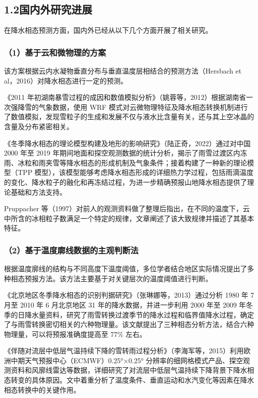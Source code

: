 \subsection*{1.2\quad 国内外研究进展}

在降水相态预测方面，国内外已经从以下几个方面开展了相关研究。

\subsubsection*{（1）基于云和微物理的方案}

该方案根据云内水凝物垂直分布与垂直温度层相结合的预测方法（Hersbach et al，2016）\cite{1}对降水相态进行一定的预测。

《2011 年初湖南暴雪过程的成因和数值模拟分析》\cite{2}（姚蓉等，2012）根据湖南省一次强降雪的气象数据，使用 WRF 模式对云微物理特征及降水相态转换机制进行了数值模拟，发现雪粒子的生成和发展不仅与液水比含量有关，还与其上空冰晶的含量及分布紧密相关。

《冬季降水相态的理论模型构建及地形的影响研究》\cite{3}（陆正奇，2022）通过对中国 2000 年至 2019 年期间地面和探空观测数据的统计分析，揭示了雨雪过渡区内冻雨、冰粒和雨夹雪等降水相态的形成机制及气象条件；接着构建了一种新的理论模型（TPP 模型），该模型能够考虑降水相态形成的详细热力学过程，包括雨滴温度的变化、降水粒子的融化和再冻结过程，为进一步精确预报山地降水相态提供了理论基础和方法支持。

Pruppacher 等（1997）对前人的观测资料做了整理后指出，在不同的温度下，云中所含的冰相粒子数满足一个特定的规律，文章阐述了该大致规律并描述了其基本特征。

\subsubsection*{（2）基于温度廓线数据的主观判断法}

根据温度廓线的结构与不同高度下温度阈值，多位学者结合地区实际情况提出了多种相态预报方法。该方法主要基于对关键层次的温度阈值进行判断。

《北京地区冬季降水相态的识别判据研究》\cite{4}（张琳娜等，2013）通过分析 1980 年 7 月至 2010 年 6 月北京地区 31 年的降水数据，并进一步利用 2000 年至 2009 年冬季的日降水量资料，研究了雨雪转换过渡季节的降水过程和临界值降水过程，确定了与雨雪转换密切相关的六种物理量。该文献提出了三种相态分析方法，结合六种物理量，可以将预报准确度提高至 77\% 左右。

《伴随对流层中低层气温持续下降的雪转雨过程分析》\cite{5}（李海军等，2015）利用欧洲中期天气预报中心（ECMWF）0.25°×0.25° 分辨率的细网格模式产品、探空观测资料和风廓线雷达等数据，详细研究了对流层中低层气温持续下降背景下降水相态转变的具体原因。文中着重分析了温度条件、垂直运动和水汽变化等因素在降水相态转换中的关键作用。

